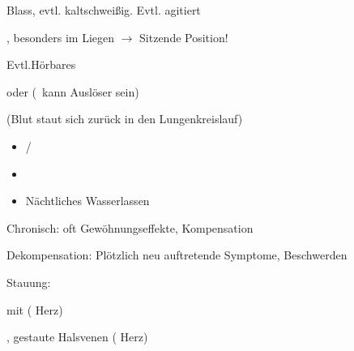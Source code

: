 {

\begin{ABCDESlide}
  \item[\ABCDE{3}] Blass, evtl. kaltschweißig. Evtl.
  agitiert
  \item[\ABCDE{4}] , besonders im Liegen
  $\rightarrow$ Sitzende Position!
  
  Evtl.Hörbares 
  \item[\ABCDE{B}] 
  \item[\ABCDE{C}] 
  \item[\ABCDE{D}]  oder 
  (\, kann Auslöser sein)
  \item[\ABCDE{E}]
  \item[\ABCDE{\ldots}]  (Blut staut sich
  zurück in den Lungenkreislauf)
  \begin{itemize}
    \item {}/
    \item {}
    \item Nächtliches Wasserlassen
  \end{itemize}
  \item[\ABCDE{=}]
  \begin{compactitem}
    \item Chronisch: oft Gewöhnungseffekte, Kompensation
    \item Dekompensation: Plötzlich neu auftretende
    Symptome, Beschwerden
    \item {}
    \begin{compactitem}
      \item {}
      \item Stauung:
      \begin{compactitem}
        \item {} mit  ( Herz)
        \item {}, gestaute Halsvenen (
        Herz)
      \end{compactitem}
    \end{compactitem}
  \end{compactitem}
\end{ABCDESlide}


}
{}
{}
{}






